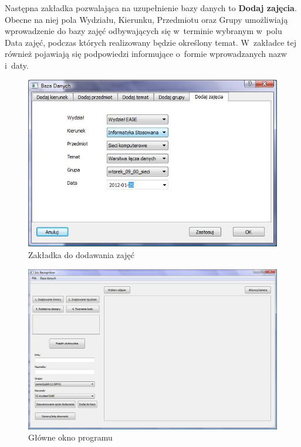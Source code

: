 Następna zakładka pozwalająca na uzupełnienie bazy danych to \textbf{Dodaj zajęcia}. Obecne na niej pola Wydziału, Kierunku, Przedmiotu oraz Grupy umożliwiają wprowadzenie do bazy zajęć odbywających się w~terminie wybranym w~polu Data zajęć, podczas których realizowany będzie określony temat. W~zakładce tej również pojawiają się podpowiedzi informujące o~formie wprowadzanych nazw i~daty.

\begin{figure}
\begin{center}
\includegraphics[scale=0.7]{dodaj_zajecia.jpg}
\caption{Zakładka do dodawania zajęć}
\label{fig:dodajZajecia}
\end{center}
\end{figure}

\begin{figure}
\begin{center}
\includegraphics[scale=0.5]{okno_glowne.jpg}
\caption{Główne okno programu}
\label{fig:oknoGlowne}
\end{center}
\end{figure}

